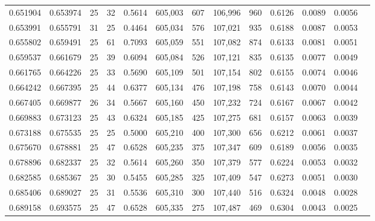 \begin{tabular}{rrrrrrrrrrrrr}
0.651904 & 0.653974 &    25 &  32 &                                     0.5614 & 605,003 &     607 & 106,996 &     960 & 0.6126 & 0.0089 & 0.0056 \\
0.653991 & 0.655791 &    31 &  25 &                                     0.4464 & 605,034 &     576 & 107,021 &     935 & 0.6188 & 0.0087 & 0.0053 \\
0.655802 & 0.659491 &    25 &  61 &                                     0.7093 & 605,059 &     551 & 107,082 &     874 & 0.6133 & 0.0081 & 0.0051 \\
0.659537 & 0.661679 &    25 &  39 &                                     0.6094 & 605,084 &     526 & 107,121 &     835 & 0.6135 & 0.0077 & 0.0049 \\
0.661765 & 0.664226 &    25 &  33 &                                     0.5690 & 605,109 &     501 & 107,154 &     802 & 0.6155 & 0.0074 & 0.0046 \\
0.664242 & 0.667395 &    25 &  44 &                                     0.6377 & 605,134 &     476 & 107,198 &     758 & 0.6143 & 0.0070 & 0.0044 \\
0.667405 & 0.669877 &    26 &  34 &                                     0.5667 & 605,160 &     450 & 107,232 &     724 & 0.6167 & 0.0067 & 0.0042 \\
0.669883 & 0.673123 &    25 &  43 &                                     0.6324 & 605,185 &     425 & 107,275 &     681 & 0.6157 & 0.0063 & 0.0039 \\
0.673188 & 0.675535 &    25 &  25 &                                     0.5000 & 605,210 &     400 & 107,300 &     656 & 0.6212 & 0.0061 & 0.0037 \\
0.675670 & 0.678881 &    25 &  47 &                                     0.6528 & 605,235 &     375 & 107,347 &     609 & 0.6189 & 0.0056 & 0.0035 \\
0.678896 & 0.682337 &    25 &  32 &                                     0.5614 & 605,260 &     350 & 107,379 &     577 & 0.6224 & 0.0053 & 0.0032 \\
0.682585 & 0.685367 &    25 &  30 &                                     0.5455 & 605,285 &     325 & 107,409 &     547 & 0.6273 & 0.0051 & 0.0030 \\
0.685406 & 0.689027 &    25 &  31 &                                     0.5536 & 605,310 &     300 & 107,440 &     516 & 0.6324 & 0.0048 & 0.0028 \\
0.689158 & 0.693575 &    25 &  47 &                                     0.6528 & 605,335 &     275 & 107,487 &     469 & 0.6304 & 0.0043 & 0.0025 \\

\end{tabular}
